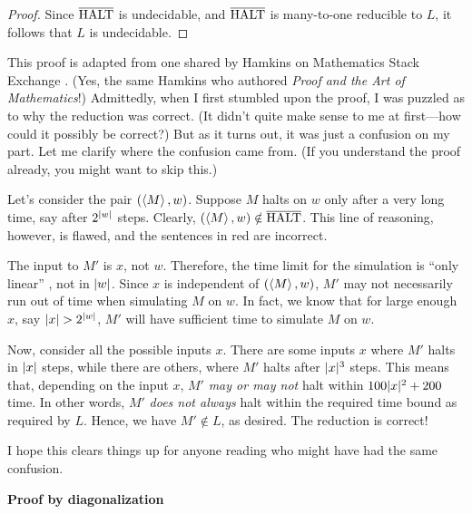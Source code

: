 \begin{problem}
\begin{sol}
\begin{proof}
        Since $\overline{\text{HALT}}$ is undecidable, and $\overline{\text{HALT}}$ is many-to-one reducible to $L$, it follows that $L$ is undecidable.
      \end{proof}

      \begin{remark}
        This proof is adapted from one shared by Hamkins on Mathematics Stack Exchange \cite{hamkins2011to}. (Yes, the same Hamkins who authored \emph{Proof and the Art of Mathematics}!) Admittedly, when I first stumbled upon the proof, I was puzzled as to why the reduction was correct. (It didn't quite make sense to me at first—how could it possibly be correct?) But as it turns out, it was just a confusion on my part. Let me clarify where the confusion came from. (If you understand the proof already, you might want to skip this.)

        Let's consider the pair $(\left< M \right>, w)$. Suppose $M$ halts on $w$ only after a very long time, say after $2^{| w |}$ steps. Clearly, $(\left< M \right>, w) \notin \overline{\text{HALT}}$.  This line of reasoning, however, is flawed, and the sentences in red are incorrect.

        The input to $M'$ is $x$, not $w$. Therefore, the time limit for the simulation is ``only linear'' , not in $| w |$. Since $x$ is independent of $(\left< M \right>, w)$, $M'$ may not necessarily run out of time when simulating $M$ on $w$. In fact, we know that for large enough $x$, say $| x | > 2^{| w |}$, $M'$ will have sufficient time to simulate $M$ on $w$.

        Now, consider all the possible inputs $x$. There are some inputs $x$ where $M'$ halts in $| x |$ steps, while there are others, where $M'$ halts after $| x |^3$ steps. This means that, depending on the input $x$, $M'$ \emph{may or may not} halt within $100 | x |^2 + 200$ time. In other words, $M'$ \emph{does not always} halt within the required time bound as required by $L$. Hence, we have $M' \notin L$, as desired. The reduction is correct!

        I hope this clears things up for anyone reading who might have had the same confusion.
      \end{remark}

      \textbf{Proof by diagonalization}
    \end{sol}
  \end{problem}

